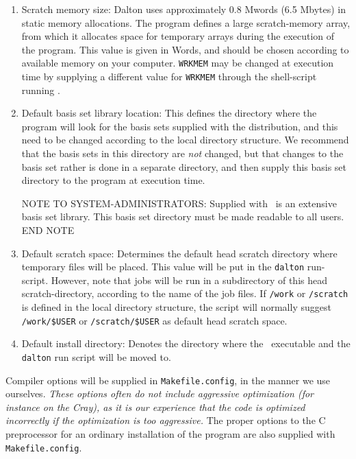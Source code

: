 \begin{enumerate}
\item Scratch memory size: Dalton uses
approximately 0.8 Mwords (6.5 Mbytes)
in static memory allocations. The program defines a large scratch-memory
array, from which it allocates space for temporary arrays
during the execution of the program. This value is given in Words, and
should be chosen according to available memory on your computer.
\verb|WRKMEM| may be changed at execution time by supplying a
different value for \verb|WRKMEM| through the shell-script running
\dalton .

\item Default basis set library location:
This defines the directory where the program will look for the
basis sets supplied with the distribution, and this need to be
changed according to the local directory structure. We recommend
that the basis sets in this directory are {\em not} changed, but
that changes to the basis set rather is done in a separate
directory, and then supply this basis set directory to the program
at execution time.

{\sc NOTE TO SYSTEM-ADMINISTRATORS:} Supplied with \dalton\ is an
extensive basis set library. This basis set directory must be made
readable to all users. {\sc END NOTE}

\item Default scratch space: Determines the
default head scratch
directory where temporary files will be placed. This value will be put
in the \verb|dalton| run-script. However, note that jobs will be run in
a subdirectory of this head scratch-directory, according to the name
of the job files. If \verb|/work| or \verb|/scratch| is defined in the
local directory structure, the script will normally suggest
\verb|/work/$USER| or  \verb|/scratch/$USER| as default head scratch space.

\item Default install directory: Denotes the directory where the \dalton\
executable and the \verb|dalton| run script will be moved to.
\end{enumerate}

Compiler options will be supplied in \verb|Makefile.config|, in the manner
we use ourselves. {\em These options often do not include aggressive
optimization\index{optimization (f77)} (for instance on the Cray), as
it is our experience that
the code is optimized incorrectly if the optimization is too
aggressive.} The proper options to the C preprocessor for an ordinary
installation of the program are also supplied with \verb|Makefile.config|.

